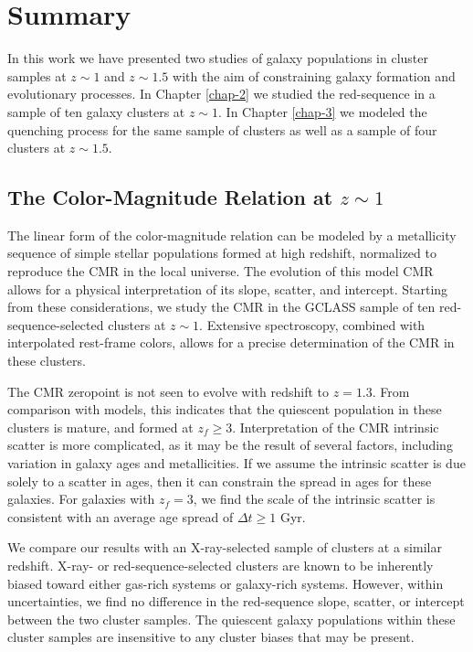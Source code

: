 \chapter{Summary}

In this work we have presented two studies of galaxy populations in cluster samples at $z\sim1$ and $z\sim1.5$ with the aim of constraining galaxy formation and evolutionary processes.
In Chapter \ref{chap-2} we studied the red-sequence in a sample of ten galaxy clusters at $z\sim1$.
In Chapter \ref{chap-3} we modeled the quenching process for the same sample of clusters as well as a sample of four clusters at $z\sim1.5$.

\section{The Color-Magnitude Relation at $z\sim1$}

The linear form of the color-magnitude relation can be modeled by a metallicity sequence of simple stellar populations formed at high redshift, normalized to reproduce the CMR in the local universe.
The evolution of this model CMR allows for a physical interpretation of its slope, scatter, and intercept.
Starting from these considerations, we study the CMR in the GCLASS sample of ten red-sequence-selected clusters at $z\sim1$.
Extensive spectroscopy, combined with interpolated rest-frame colors, allows for a precise determination of the CMR in these clusters.

The CMR zeropoint is not seen to evolve with redshift to $z=1.3$.
From comparison with models, this indicates that the quiescent population in these clusters is mature, and formed at $z_f \geq 3$.
Interpretation of the CMR intrinsic scatter is more complicated, as it may be the result of several factors, including variation in galaxy ages and metallicities.
If we assume the intrinsic scatter is due solely to a scatter in ages, then it can constrain the spread in ages for these galaxies.
For galaxies with $z_f=3$, we find the scale of the intrinsic scatter is consistent with an average age spread of $\Delta t \geq 1$ Gyr.


We compare our results with an X-ray-selected sample of clusters at a similar redshift.
X-ray- or red-sequence-selected clusters are known to be inherently biased toward either gas-rich systems or galaxy-rich systems.
However, within uncertainties, we find no difference in the red-sequence slope, scatter, or intercept between the two cluster samples.
The quiescent galaxy populations within these cluster samples are insensitive to any cluster biases that may be present.

